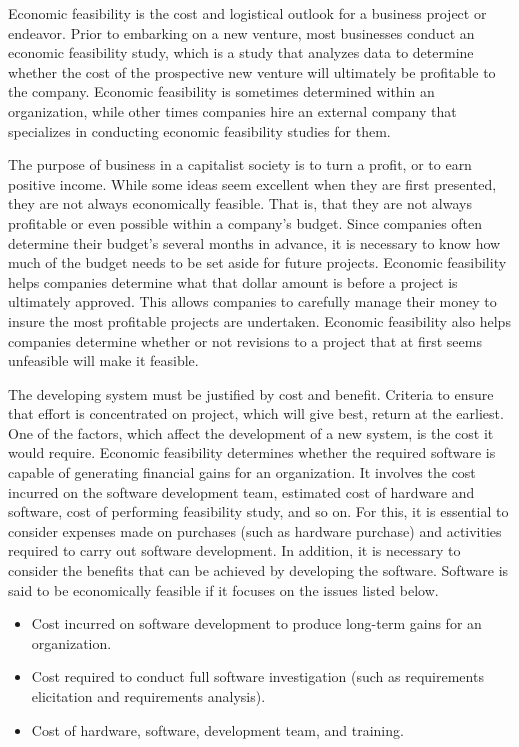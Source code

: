 Economic feasibility is the cost and logistical outlook for a business project or endeavor. Prior to embarking on a new venture, most businesses conduct an economic feasibility study, which is a study that analyzes data to determine whether the cost of the prospective new venture will ultimately be profitable to the company. Economic feasibility is sometimes determined within an organization, while other times companies hire an external company that specializes in conducting economic feasibility studies for them.

The purpose of business in a capitalist society is to turn a profit, or to earn positive income. While some ideas seem excellent when they are first presented, they are not always economically feasible. That is, that they are not always profitable or even possible within a company's budget. Since companies often determine their budget's several months in advance, it is necessary to know how much of the budget needs to be set aside for future projects. Economic feasibility helps companies determine what that dollar amount is before a project is ultimately approved. This allows companies to carefully manage their money to insure the most profitable projects are undertaken. Economic feasibility also helps companies determine whether or not revisions to a project that at first seems unfeasible will make it feasible.

The developing system must be justified by cost and benefit. Criteria to ensure that effort is concentrated on project, which will give best, return at the earliest. One of the factors, which affect the development of a new system, is the cost it would require. Economic feasibility determines whether the required software is capable of generating financial gains for an organization. It involves the cost incurred on the software development team, estimated cost of hardware and software, cost of performing feasibility study, and so on. For this, it is essential to consider expenses made on purchases (such as hardware purchase) and activities required to carry out software development. In addition, it is necessary to consider the benefits that can be achieved by developing the software. Software is said to be economically feasible if it focuses on the issues listed below.
\begin{itemize}
	\item Cost incurred on software development to produce long-term gains for an organization.
	\item Cost required to conduct full software investigation (such as requirements elicitation and requirements analysis).
	\item Cost of hardware, software, development team, and training.
\end{itemize}

